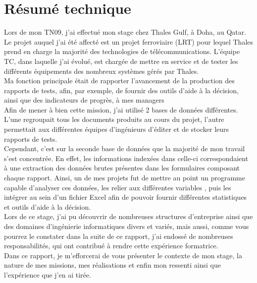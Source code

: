 \chapter*{Résumé technique}

Lors de mon TN09, j'ai effectué mon stage chez Thales Gulf, à Doha, au Qatar. Le projet auquel j'ai été affecté est un projet ferroviaire (\gls{LRT}) pour lequel Thales prend en charge la majorité des technologies de télécommunications. L'équipe \gls{TC}, dans laquelle j'ai évolué, est chargée de mettre en service et de tester les différents équipements des nombreux systèmes gérés par Thales. \\
Ma fonction principale était de rapporter l'avancement de la production des rapports de tests, afin, par exemple, de fournir des outils d'aide à la décision, ainsi que des indicateurs de progrès, à mes managers \\
Afin de mener à bien cette mission, j'ai utilisé 2 bases de données différentes. L'une regroupait tous les documents produits au cours du projet, l'autre permettait aux différentes équipes d'ingénieurs d'éditer et de stocker leurs rapports de tests. \\
Cependant, c'est sur la seconde base de données que la majorité de mon travail s'est concentrée. En effet, les informations indexées dans celle-ci correspondaient à une extraction des données brutes présentes dans les formulaires composant chaque rapport. Ainsi, un de mes projets fut de mettre au point un programme capable d'analyser ces données, les relier aux différentes variables , puis les intégrer au sein d'un fichier Excel afin de pouvoir fournir différentes statistiques et outils d'aide à la décision.\\
Lors de ce stage, j'ai pu découvrir de nombreuses structures d'entreprise ainsi que des domaines d'ingénierie informatiques divers et variés, mais aussi, comme vous pourrez le constater dans la suite de ce rapport, j'ai endossé de nombreuses responsabilités, qui ont contribué à rendre cette expérience formatrice. \\
Dans ce rapport, je m'efforcerai de vous présenter le contexte de mon stage, la nature de mes missions, mes réalisations et enfin mon ressenti ainsi que l'expérience que j'en ai tirée.
